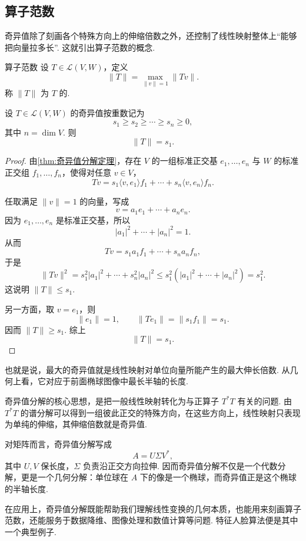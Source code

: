 \subsection*{算子范数}

奇异值除了刻画各个特殊方向上的伸缩倍数之外，还控制了线性映射整体上“能够把向量拉多长”. 这就引出算子范数的概念.

\begin{definition}{算子范数}{} 
    设 $ T \in \mathcal{L}(V, W) $，定义
    \[
        \lVert T \rVert = \max_{\lVert v \rVert = 1}\lVert Tv \rVert.
    \]
    称 $ \lVert T \rVert $ 为 $ T $ 的.
\end{definition}

\begin{theorem}{}{}
    设 $ T \in \mathcal{L}(V, W) $ 的奇异值按重数记为
    \[
        s_1 \geqslant s_2 \geqslant \cdots \geqslant s_n \geqslant 0,
    \]
    其中 $ n = \dim V $. 则
    \[
        \lVert T \rVert = s_1.
    \]
\end{theorem}

\begin{proof}
    由\autoref{thm:奇异值分解定理}，存在 $ V $ 的一组标准正交基 $ e_1, \ldots, e_n $ 与 $ W $ 的标准正交组 $ f_1, \ldots, f_n $，使得对任意 $ v \in V $，
    \[
        Tv = s_1 \langle v, e_1 \rangle f_1 + \cdots + s_n \langle v, e_n \rangle f_n.
    \]

    任取满足 $ \lVert v \rVert = 1 $ 的向量，写成
    \[
        v = a_1e_1 + \cdots + a_ne_n.
    \]
    因为 $ e_1, \ldots, e_n $ 是标准正交基，所以
    \[
        |a_1|^2 + \cdots + |a_n|^2 = 1.
    \]
    从而
    \[
        Tv = s_1a_1f_1 + \cdots + s_na_nf_n,
    \]
    于是
    \[
        \lVert Tv \rVert^2 = s_1^2|a_1|^2 + \cdots + s_n^2|a_n|^2 \leqslant s_1^2(|a_1|^2 + \cdots + |a_n|^2) = s_1^2.
    \]
    这说明 $ \lVert T \rVert \leqslant s_1 $.

    另一方面，取 $ v = e_1 $，则
    \[
        \lVert e_1 \rVert = 1,\qquad \lVert Te_1 \rVert = \lVert s_1f_1 \rVert = s_1.
    \]
    因而 $ \lVert T \rVert \geqslant s_1 $. 综上
    \[
        \lVert T \rVert = s_1.
    \]
\end{proof}

也就是说，最大的奇异值就是线性映射对单位向量所能产生的最大伸长倍数. 从几何上看，它对应于前面椭球图像中最长半轴的长度.

\begin{summary}
    奇异值分解的核心思想，是把一般线性映射转化为与正算子 $ T^*T $ 有关的问题. 由 $ T^*T $ 的谱分解可以得到一组彼此正交的特殊方向，在这些方向上，线性映射只表现为单纯的伸缩，其伸缩倍数就是奇异值.

    对矩阵而言，奇异值分解写成
    \[
        A = U\Sigma V^*,
    \]
    其中 $ U, V $ 保长度，$ \Sigma $ 负责沿正交方向拉伸. 因而奇异值分解不仅是一个代数分解，更是一个几何分解：单位球在 $ A $ 下的像是一个椭球，而奇异值正是这个椭球的半轴长度.

    在应用上，奇异值分解既能帮助我们理解线性变换的几何本质，也能用来刻画算子范数，还能服务于数据降维、图像处理和数值计算等问题. 特征人脸算法便是其中一个典型例子.
\end{summary}

